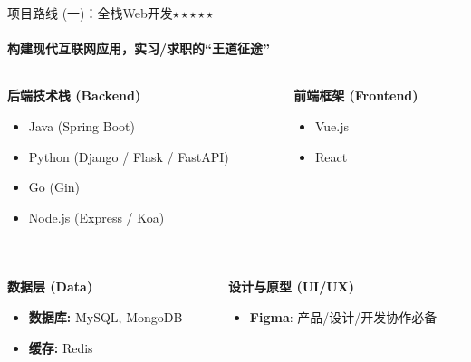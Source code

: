 \documentclass{beamer}
\begin{document}
\begin{frame}{项目路线 (一)：全栈Web开发$\star \star \star \star \star$}
    \framesubtitle{构建现代互联网应用，实习/求职的“王道征途”}

    \begin{columns}[T]
        \begin{column}{0.5\textwidth}
            \Large \textbf{后端技术栈 (Backend)}
            \begin{itemize}
                \item Java (\alert{Spring Boot})
                \item Python (Django / Flask / FastAPI)
                \item Go (Gin)
                \item Node.js (Express / Koa)
            \end{itemize}
        \end{column}
        \begin{column}{0.5\textwidth}
            \Large \textbf{前端框架 (Frontend)}
            \begin{itemize}
                \item \alert{Vue.js}
                \item React
            \end{itemize}
        \end{column}
    \end{columns}
    
    \vfill
    \rule{\textwidth}{0.4pt}
    \vfill
    
    \begin{columns}[T]
        \begin{column}{0.5\textwidth}
            \Large \textbf{数据层 (Data)}
            \begin{itemize}
                \item \textbf{数据库:} MySQL, MongoDB
                \item \textbf{缓存:} Redis
            \end{itemize}
        \end{column}
        \begin{column}{0.5\textwidth}
            \Large \textbf{设计与原型 (UI/UX)}
            \begin{itemize}
                \item \textbf{Figma}: \small 产品/设计/开发协作必备
            \end{itemize}
        \end{column}
    \end{columns}
    
\end{frame}
\end{document}
